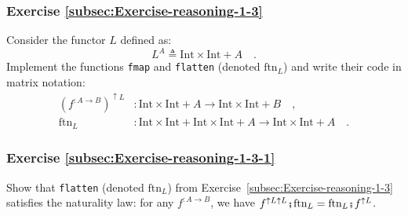 \subsubsection{Exercise \label{subsec:Exercise-reasoning-1-3}\ref{subsec:Exercise-reasoning-1-3}}

Consider the functor $L$ defined as:
\[
L^{A}\triangleq\text{Int}\times\text{Int}+A\quad.
\]
Implement the functions \lstinline!fmap! and \lstinline!flatten!
(denoted $\text{ftn}_{L}$) and write their code in matrix notation:
\begin{align*}
(f^{:A\rightarrow B})^{\uparrow L} & :\text{Int}\times\text{Int}+A\rightarrow\text{Int}\times\text{Int}+B\quad,\\
\text{ftn}_{L} & :\text{Int}\times\text{Int}+\text{Int}\times\text{Int}+A\rightarrow\text{Int}\times\text{Int}+A\quad.
\end{align*}


\subsubsection{Exercise \label{subsec:Exercise-reasoning-1-3-1}\ref{subsec:Exercise-reasoning-1-3-1}}

Show that \lstinline!flatten! (denoted $\text{ftn}_{L}$) from Exercise~\ref{subsec:Exercise-reasoning-1-3}
satisfies the naturality law: for any $f^{:A\rightarrow B}$, we have
$f^{\uparrow L\uparrow L}\bef\text{ftn}_{L}=\text{ftn}_{L}\bef f^{\uparrow L}$.
